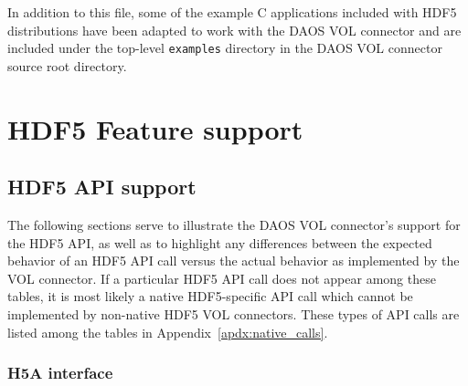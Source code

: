 In addition to this file, some of the example C applications included with HDF5 distributions have been adapted to work with the DAOS VOL connector and are included under the top-level \texttt{examples} directory in the DAOS VOL connector source root directory.

\newpage

\section{HDF5 Feature support}

\subsection{HDF5 API support}

The following sections serve to illustrate the DAOS VOL connector's support for the HDF5 API, as well as to highlight any differences between the expected behavior of an HDF5 API call versus the actual behavior as implemented by the VOL connector. If a particular HDF5 API call does not appear among these tables, it is most likely a native HDF5-specific API call which cannot be implemented by non-native HDF5 VOL connectors. These types of API calls are listed among the tables in Appendix~\ref{apdx:native_calls}.

\subsubsection{H5A interface}

